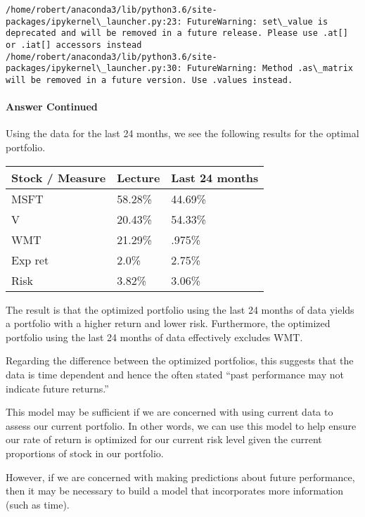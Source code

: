 \documentclass[11pt]{article}
\begin{document}
    \begin{Verbatim}[commandchars=\\\{\}]
/home/robert/anaconda3/lib/python3.6/site-packages/ipykernel\_launcher.py:23: FutureWarning: set\_value is deprecated and will be removed in a future release. Please use .at[] or .iat[] accessors instead
/home/robert/anaconda3/lib/python3.6/site-packages/ipykernel\_launcher.py:30: FutureWarning: Method .as\_matrix will be removed in a future version. Use .values instead.

    \end{Verbatim}

    \hypertarget{answer-continued}{%
\paragraph{Answer Continued}\label{answer-continued}}

Using the data for the last 24 months, we see the following results for
the optimal portfolio.

\begin{longtable}[]{@{}lll@{}}
\toprule
Stock / Measure & Lecture & Last 24 months\tabularnewline
\midrule
\endhead
MSFT & 58.28\% & 44.69\%\tabularnewline
V & 20.43\% & 54.33\%\tabularnewline
WMT & 21.29\% & .975\%\tabularnewline
Exp ret & 2.0\% & 2.75\%\tabularnewline
Risk & 3.82\% & 3.06\%\tabularnewline
\bottomrule
\end{longtable}

The result is that the optimized portfolio using the last 24 months of
data yields a portfolio with a higher return and lower risk.
Furthermore, the optimized portfolio using the last 24 months of data
effectively excludes WMT.

Regarding the difference between the optimized portfolios, this suggests
that the data is time dependent and hence the often stated ``past
performance may not indicate future returns.''

This model may be sufficient if we are concerned with using current data
to assess our current portfolio. In other words, we can use this model
to help ensure our rate of return is optimized for our current risk
level given the current proportions of stock in our portfolio.

However, if we are concerned with making predictions about future
performance, then it may be necessary to build a model that incorporates
more information (such as time).


    
    
    
    
\end{document}
